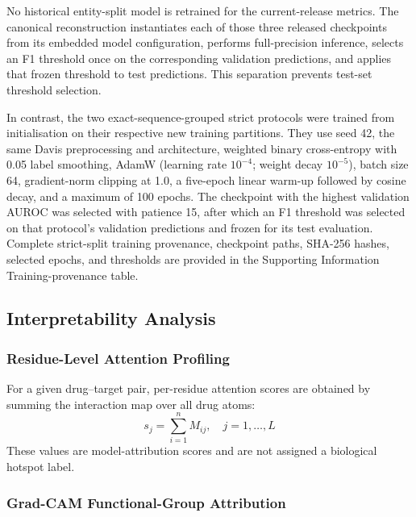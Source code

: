\documentclass[fleqn,10pt]{wlscirep}
\begin{document}
No historical entity-split model is retrained for the current-release metrics.
The canonical reconstruction instantiates each of those three released
checkpoints from its embedded model configuration, performs full-precision
inference, selects an F1 threshold once on the corresponding validation
predictions, and applies that frozen threshold to test predictions. This
separation prevents test-set threshold selection.

In contrast, the two exact-sequence-grouped strict protocols were trained from
initialisation on their respective new training partitions. They use seed 42,
the same Davis preprocessing and architecture, weighted binary cross-entropy
with 0.05 label smoothing, AdamW (learning rate $10^{-4}$; weight decay
$10^{-5}$), batch size 64, gradient-norm clipping at 1.0, a five-epoch linear
warm-up followed by cosine decay, and a maximum of 100 epochs. The checkpoint
with the highest validation AUROC was selected with patience 15, after which an
F1 threshold was selected on that protocol's validation predictions and frozen
for its test evaluation. Complete strict-split training provenance, checkpoint
paths, SHA-256 hashes, selected epochs, and thresholds are provided in the
Supporting Information Training-provenance table.

\subsection{Interpretability Analysis}

\subsubsection{Residue-Level Attention Profiling}

For a given drug--target pair, per-residue attention scores are obtained by
summing the interaction map over all drug atoms:
\begin{equation}
s_j = \sum_{i=1}^{n} M_{ij},\quad j=1,\ldots,L
\end{equation}
These values are model-attribution scores and are not assigned a biological
hotspot label.

\subsubsection{Grad-CAM Functional-Group Attribution}
\end{document}
